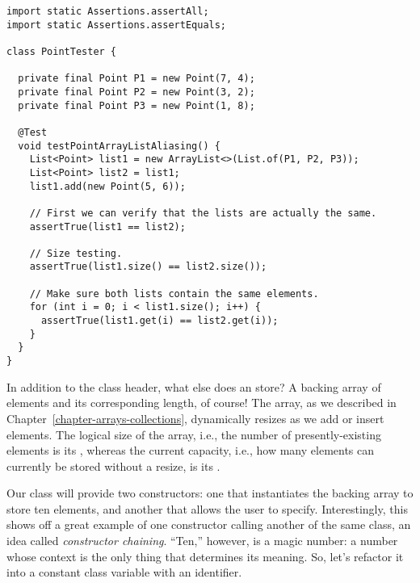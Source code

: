\begin{lstlisting}[language=MyJava]
import static Assertions.assertAll;
import static Assertions.assertEquals;

class PointTester {

  private final Point P1 = new Point(7, 4);
  private final Point P2 = new Point(3, 2);
  private final Point P3 = new Point(1, 8);

  @Test
  void testPointArrayListAliasing() {
    List<Point> list1 = new ArrayList<>(List.of(P1, P2, P3));
    List<Point> list2 = list1;
    list1.add(new Point(5, 6));

    // First we can verify that the lists are actually the same.
    assertTrue(list1 == list2);

    // Size testing.
    assertTrue(list1.size() == list2.size());

    // Make sure both lists contain the same elements.
    for (int i = 0; i < list1.size(); i++) {
      assertTrue(list1.get(i) == list2.get(i));
    }
  }
}
\end{lstlisting}


In addition to the class header, what else does an  store? A backing array of elements and its corresponding length, of course! The array, as we described in Chapter~\ref{chapter-arrays-collections}, dynamically resizes as we add or insert elements. The logical size of the array, i.e., the number of presently-existing elements is its , whereas the current capacity, i.e., how many elements can currently be stored without a resize, is its . 

Our class will provide two constructors: one that instantiates the backing array to store ten elements, and another that allows the user to specify. Interestingly, this shows off a great example of one constructor calling another of the same class, an idea called \emph{constructor chaining}. ``Ten,'' however, is a magic number: a number whose context is the only thing that determines its meaning. So, let's refactor it into a constant class variable with an identifier.

